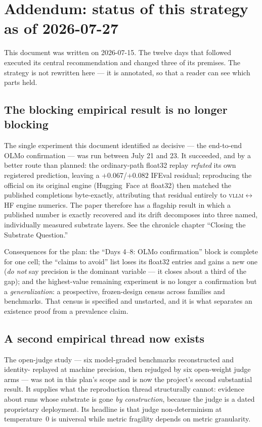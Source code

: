 \documentclass[11pt]{article}
\newcommand{\code}[1]{\texttt{\detokenize{#1}}}
\begin{document}
\section{Addendum: status of this strategy as of 2026-07-27}

This document was written on 2026-07-15. The twelve days that followed executed its
central recommendation and changed three of its premises. The strategy is not
rewritten here --- it is annotated, so that a reader can see which parts held.

\subsection{The blocking empirical result is no longer blocking}

The single experiment this document identified as decisive --- the end-to-end OLMo
confirmation --- was run between July 21 and 23. It succeeded, and by a better route
than planned: the ordinary-path float32 replay \emph{refuted} its own registered
prediction, leaving a $+0.067$/$+0.082$ IFEval residual; reproducing the official on
its original engine (Hugging~Face \code{transformers} at float32) then matched the
published completions byte-exactly, attributing that residual entirely to
\textsc{vllm}$\leftrightarrow$HF engine numerics. The paper therefore has a
flagship result in which a published number is exactly recovered and its drift
decomposes into three named, individually measured substrate layers. See the
chronicle chapter ``Closing the Substrate Question.''

Consequences for the plan: the ``Days 4--8: OLMo confirmation'' block is complete for
one cell; the ``claims to avoid'' list loses its float32 entries and gains a new one
(\emph{do not} say precision is the dominant variable --- it closes about a third of
the gap); and the highest-value remaining experiment is no longer a confirmation but
a \emph{generalization}: a prospective, frozen-design census across families and
benchmarks. That census is specified and unstarted, and it is what separates an
existence proof from a prevalence claim.

\subsection{A second empirical thread now exists}

The open-judge study --- six model-graded benchmarks reconstructed and identity-
replayed at machine precision, then rejudged by six open-weight judge arms --- was
not in this plan's scope and is now the project's second substantial result. It
supplies what the reproduction thread structurally cannot: evidence about runs whose
substrate is gone \emph{by construction}, because the judge is a dated proprietary
deployment. Its headline is that judge non-determinism at temperature~0 is universal
while metric fragility depends on metric granularity.
\end{document}

